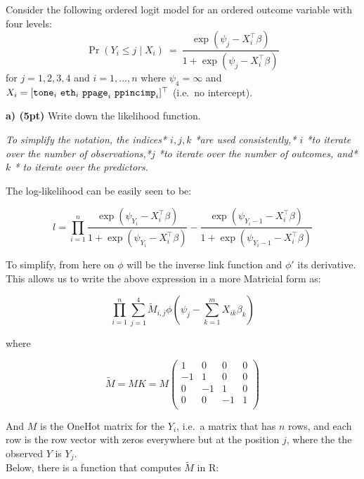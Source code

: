 \documentclass{article}
\begin{document}
Consider the following ordered logit model for an ordered outcome
variable with four levels:
\[ \Pr(Y_i \leq j \mid X_i) \ = \ \frac{\exp(\psi_j - X_i^\top\beta)}
            {1 + \exp(\psi_j - X_i^\top\beta)} \] for \(j = 1,2,3,4\)
and \(i = 1,...,n\) where \(\psi_4=\infty\) and
\(X_i = [{\tt tone}_i \ {\tt eth}_i \ {\tt ppage}_i \ {\tt ppincimp}_i]^\top\)
(i.e.~no intercept).

    \textbf{a) (5pt)} Write down the likelihood function.

    \emph{To simplify the notation, the indices* $i,j,k$ *are used consistently,* $i$ *to iterate over the number of observations,*$j$ *to iterate over the number of outcomes, and* $k$ * to iterate over the predictors.}

The log-likelihood can be easily seen to be:

\[
l = 
\prod_{i=1}^n 
\frac{\exp(\psi_{Y_i} - X_i^\top\beta)}
     {1 + \exp(\psi_{Y_i} - X_i^\top\beta)} -
\frac{\exp(\psi_{Y_i-1} - X_i^\top\beta)}
     {1 + \exp(\psi_{Y_i-1} - X_i^\top\beta)}
\]

To simplify, from here on \(\phi\) will be the inverse link function and
\(\phi'\) its derivative. This allows us to write the above expression
in a more Matricial form as:

\[
\prod_{i=1}^n \sum_{j=1}^4
\tilde M_{i,j}
\phi\left(\psi_{j} - \sum_{k=1}^m X_{ik}\beta_k\right)
\]

where

\[
\tilde M = MK =  M 
\begin{pmatrix}
  1 &  0 &  0 &  0\\
 -1 &  1 &  0 &  0\\
  0 & -1 &  1 &  0\\
  0 &  0 & -1 &  1\\
\end{pmatrix}
\]

And \(M\) is the OneHot matrix for the \(Y_i\), i.e.~a matrix that has
\(n\) rows, and each row is the row vector with zeros everywhere but at
the position \(j\), where the the observed \(Y\) is \(Y_j\).\\
Below, there is a function that computes \(\tilde M\) in R:
\end{document}
